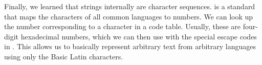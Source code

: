 Finally, we learned that strings internally are  character sequences.
 is a standard that maps the characters of all common languages to numbers.
We can look up the number corresponding to a character in a  code table.
Usually, these are four-digit hexadecimal numbers, which we can then use with the special \pythonil{\\u} escape codes in \python.
This allows us to basically represent arbitrary text from arbitrary languages using only the Basic Latin characters.%
\endhsection%
%
\endhsection%
%
